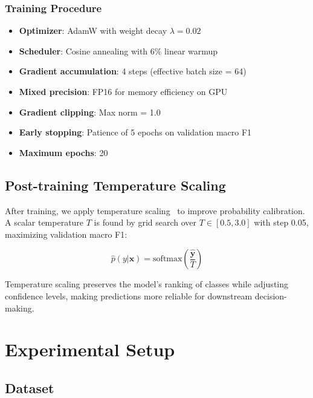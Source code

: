 \documentclass[conference, 10pt]{IEEEtran}
\begin{document}
\subsubsection{Training Procedure}
\begin{itemize}[noitemsep]
    \item \textbf{Optimizer}: AdamW with weight decay $\lambda = 0.02$
    \item \textbf{Scheduler}: Cosine annealing with 6\% linear warmup
    \item \textbf{Gradient accumulation}: 4 steps (effective batch size = 64)
    \item \textbf{Mixed precision}: FP16 for memory efficiency on GPU
    \item \textbf{Gradient clipping}: Max norm = 1.0
    \item \textbf{Early stopping}: Patience of 5 epochs on validation macro F1
    \item \textbf{Maximum epochs}: 20
\end{itemize}

\subsection{Post-training Temperature Scaling}

After training, we apply temperature scaling~\cite{guo2017calibration} to improve probability calibration. A scalar temperature $T$ is found by grid search over $T \in [0.5, 3.0]$ with step 0.05, maximizing validation macro F1:

\begin{equation}
    \hat{p}(y|\mathbf{x}) = \text{softmax}\left(\frac{\hat{\mathbf{y}}}{T}\right)
    \label{eq:temp}
\end{equation}

Temperature scaling preserves the model's ranking of classes while adjusting confidence levels, making predictions more reliable for downstream decision-making.


\section{Experimental Setup}

\subsection{Dataset}
\end{document}
